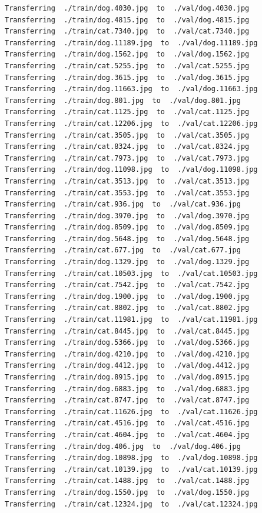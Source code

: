 \documentclass[]{book}
\theoremstyle{definition}
\theoremstyle{definition}
\theoremstyle{definition}
\theoremstyle{remark}
\begin{document}
\begin{verbatim}
Transferring  ./train/dog.4030.jpg  to  ./val/dog.4030.jpg
Transferring  ./train/dog.4815.jpg  to  ./val/dog.4815.jpg
Transferring  ./train/cat.7340.jpg  to  ./val/cat.7340.jpg
Transferring  ./train/dog.11189.jpg  to  ./val/dog.11189.jpg
Transferring  ./train/dog.1562.jpg  to  ./val/dog.1562.jpg
Transferring  ./train/cat.5255.jpg  to  ./val/cat.5255.jpg
Transferring  ./train/dog.3615.jpg  to  ./val/dog.3615.jpg
Transferring  ./train/dog.11663.jpg  to  ./val/dog.11663.jpg
Transferring  ./train/dog.801.jpg  to  ./val/dog.801.jpg
Transferring  ./train/cat.1125.jpg  to  ./val/cat.1125.jpg
Transferring  ./train/cat.12206.jpg  to  ./val/cat.12206.jpg
Transferring  ./train/cat.3505.jpg  to  ./val/cat.3505.jpg
Transferring  ./train/cat.8324.jpg  to  ./val/cat.8324.jpg
Transferring  ./train/cat.7973.jpg  to  ./val/cat.7973.jpg
Transferring  ./train/dog.11098.jpg  to  ./val/dog.11098.jpg
Transferring  ./train/cat.3513.jpg  to  ./val/cat.3513.jpg
Transferring  ./train/cat.3553.jpg  to  ./val/cat.3553.jpg
Transferring  ./train/cat.936.jpg  to  ./val/cat.936.jpg
Transferring  ./train/dog.3970.jpg  to  ./val/dog.3970.jpg
Transferring  ./train/dog.8509.jpg  to  ./val/dog.8509.jpg
Transferring  ./train/dog.5648.jpg  to  ./val/dog.5648.jpg
Transferring  ./train/cat.677.jpg  to  ./val/cat.677.jpg
Transferring  ./train/dog.1329.jpg  to  ./val/dog.1329.jpg
Transferring  ./train/cat.10503.jpg  to  ./val/cat.10503.jpg
Transferring  ./train/cat.7542.jpg  to  ./val/cat.7542.jpg
Transferring  ./train/dog.1900.jpg  to  ./val/dog.1900.jpg
Transferring  ./train/cat.8802.jpg  to  ./val/cat.8802.jpg
Transferring  ./train/cat.11981.jpg  to  ./val/cat.11981.jpg
Transferring  ./train/cat.8445.jpg  to  ./val/cat.8445.jpg
Transferring  ./train/dog.5366.jpg  to  ./val/dog.5366.jpg
Transferring  ./train/dog.4210.jpg  to  ./val/dog.4210.jpg
Transferring  ./train/dog.4412.jpg  to  ./val/dog.4412.jpg
Transferring  ./train/dog.8915.jpg  to  ./val/dog.8915.jpg
Transferring  ./train/dog.6883.jpg  to  ./val/dog.6883.jpg
Transferring  ./train/cat.8747.jpg  to  ./val/cat.8747.jpg
Transferring  ./train/cat.11626.jpg  to  ./val/cat.11626.jpg
Transferring  ./train/cat.4516.jpg  to  ./val/cat.4516.jpg
Transferring  ./train/cat.4604.jpg  to  ./val/cat.4604.jpg
Transferring  ./train/dog.406.jpg  to  ./val/dog.406.jpg
Transferring  ./train/dog.10898.jpg  to  ./val/dog.10898.jpg
Transferring  ./train/cat.10139.jpg  to  ./val/cat.10139.jpg
Transferring  ./train/cat.1488.jpg  to  ./val/cat.1488.jpg
Transferring  ./train/dog.1550.jpg  to  ./val/dog.1550.jpg
Transferring  ./train/cat.12324.jpg  to  ./val/cat.12324.jpg

\end{verbatim}
\end{document}
